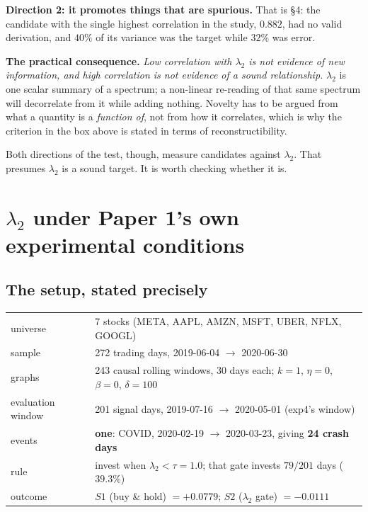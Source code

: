 \documentclass[11pt,a4paper]{article}
\begin{document}
\medskip
\noindent\textbf{Direction 2: it promotes things that are spurious.} That is
\S4: the candidate with the single highest correlation in the study, $0.882$, had
no valid derivation, and $40\%$ of its variance was the target while $32\%$ was
error.

\medskip
\noindent\textbf{The practical consequence.} \emph{Low correlation with $\lambda_2$
is not evidence of new information, and high correlation is not evidence of a
sound relationship.} $\lambda_2$ is one scalar summary of a spectrum; a non-linear
re-reading of that same spectrum will decorrelate from it while adding nothing.
Novelty has to be argued from what a quantity is a \emph{function of}, not from how
it correlates, which is why the criterion in the box above is stated in terms of
reconstructibility.

Both directions of the test, though, measure candidates against $\lambda_2$. That
presumes $\lambda_2$ is a sound target. It is worth checking whether it is.

\section{$\lambda_2$ under Paper 1's own experimental conditions}

\subsection*{The setup, stated precisely}

\begin{center}\small
\renewcommand{\arraystretch}{1.15}
\begin{tabular}{@{}ll@{}}
\toprule
universe & 7 stocks (META, AAPL, AMZN, MSFT, UBER, NFLX, GOOGL) \\
sample & 272 trading days, 2019-06-04 $\to$ 2020-06-30 \\
graphs & 243 causal rolling windows, 30 days each; $k=1$, $\eta=0$,
$\beta=0$, $\delta=100$ \\
evaluation window & 201 signal days, 2019-07-16 $\to$ 2020-05-01 (exp4's window) \\
events & \textbf{one}: COVID, 2020-02-19 $\to$ 2020-03-23, giving \textbf{24 crash days} \\
rule & invest when $\lambda_2 < \tau = 1.0$; that gate invests $79/201$ days ($39.3\%$) \\
outcome & $S1$ (buy \& hold) $= +0.0779$; \quad $S2$ ($\lambda_2$ gate) $= -0.0111$ \\
\bottomrule
\end{tabular}
\end{center}
\end{document}
